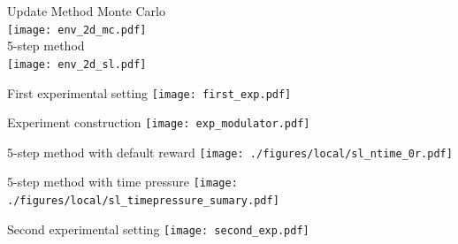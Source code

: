 \documentclass[hyperref={pdfpagelabels=false}]{beamer}
\begin{document}
\begin{frame}{Update Method}
Monte Carlo\\
\vspace{1em}
\texttt{[image: env\_2d\_mc.pdf]} \\ \pause
\vspace{1em}
5-step method\\
\vspace{1em}
\texttt{[image: env\_2d\_sl.pdf]}
\end{frame}

\begin{frame}{First experimental setting}
\texttt{[image: first\_exp.pdf]}
\end{frame}

\begin{frame}{Experiment construction}
\texttt{[image: exp\_modulator.pdf]}
\end{frame}

\begin{frame}{5-step method with default reward}
\texttt{[image: ./figures/local/sl\_ntime\_0r.pdf]}
\end{frame}

\begin{frame}{5-step method with time pressure}
\texttt{[image: ./figures/local/sl\_timepressure\_sumary.pdf]}
\end{frame}

\begin{frame}{Second experimental setting}
\texttt{[image: second\_exp.pdf]}
\end{frame}
\end{document}

